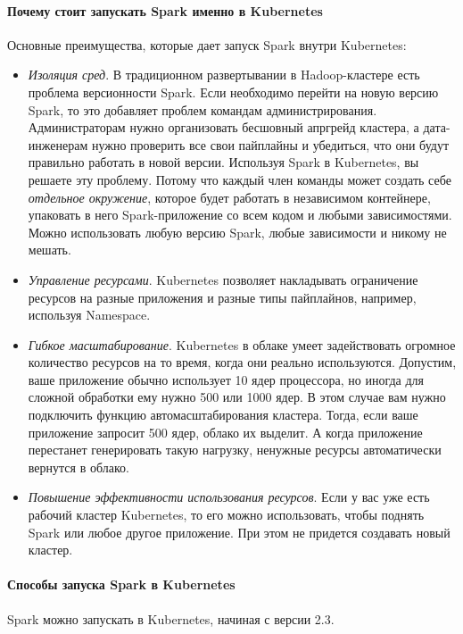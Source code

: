\documentclass[%
	11pt,
	a4paper,
	utf8,
		]{article}
\begin{document}
\paragraph{Почему стоит запускать Spark именно в Kubernetes} Основные преимущества, которые дает запуск Spark внутри Kubernetes:
\begin{itemize}
	\item \emph{Изоляция сред}. В традиционном развертывании в Hadoop-кластере есть проблема версионности Spark. Если необходимо перейти на новую версию Spark, то это добавляет проблем командам администрирования. Администраторам нужно организовать бесшовный апргрейд кластера, а дата-инженерам нужно проверить все свои пайплайны и убедиться, что они будут правильно работать в новой версии. Используя Spark в Kubernetes, вы решаете эту проблему. Потому что каждый член команды может создать себе \emph{отдельное окружение}, которое будет работать в независимом контейнере, упаковать в него Spark-приложение со всем кодом и любыми зависимостями. Можно использовать любую версию Spark, любые зависимости и никому не мешать.
	
	\item \emph{Управление ресурсами}. Kubernetes позволяет накладывать ограничение ресурсов на разные приложения и разные типы пайплайнов, например, используя Namespace.
	
	\item \emph{Гибкое масштабирование}. Kubernetes в облаке умеет задействовать огромное количество ресурсов на то время, когда они реально используются. Допустим, ваше приложение обычно использует 10 ядер процессора, но иногда для сложной обработки ему нужно 500 или 1000 ядер. В этом случае вам нужно подключить функцию автомасштабирования кластера. Тогда, если ваше приложение запросит 500 ядер, облако их выделит. А когда приложение перестанет генерировать такую нагрузку, ненужные ресурсы автоматически вернутся в облако.
	
	\item \emph{Повышение эффективности использования ресурсов}. Если у вас уже есть рабочий кластер Kubernetes, то его можно использовать, чтобы поднять Spark или любое другое приложение. При этом не придется создавать новый кластер.
\end{itemize}

\paragraph{Способы запуска Spark в Kubernetes} Spark можно запускать в Kubernetes, начиная с версии 2.3.
\end{document}
